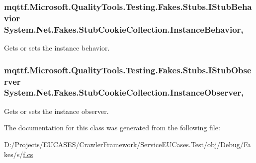\hypertarget{class_system_1_1_net_1_1_fakes_1_1_stub_cookie_collection_ac4af0aa7fdcf96266613478fdea97b8f}{
\subsubsection[{Instance\-Behavior}]{\setlength{\rightskip}{0pt plus 5cm}mqttf.\-Microsoft.\-Quality\-Tools.\-Testing.\-Fakes.\-Stubs.\-I\-Stub\-Behavior System.\-Net.\-Fakes.\-Stub\-Cookie\-Collection.\-Instance\-Behavior\hspace{0.3cm}{\ttfamily [get]}, {\ttfamily [set]}}}\label{class_system_1_1_net_1_1_fakes_1_1_stub_cookie_collection_ac4af0aa7fdcf96266613478fdea97b8f}


Gets or sets the instance behavior.

\hypertarget{class_system_1_1_net_1_1_fakes_1_1_stub_cookie_collection_af2cf97306a87b8083b285aaac441acd6}{
\subsubsection[{Instance\-Observer}]{\setlength{\rightskip}{0pt plus 5cm}mqttf.\-Microsoft.\-Quality\-Tools.\-Testing.\-Fakes.\-Stubs.\-I\-Stub\-Observer System.\-Net.\-Fakes.\-Stub\-Cookie\-Collection.\-Instance\-Observer\hspace{0.3cm}{\ttfamily [get]}, {\ttfamily [set]}}}\label{class_system_1_1_net_1_1_fakes_1_1_stub_cookie_collection_af2cf97306a87b8083b285aaac441acd6}


Gets or sets the instance observer.



The documentation for this class was generated from the following file\-:\begin{DoxyCompactItemize}
\item 
D\-:/\-Projects/\-E\-U\-C\-A\-S\-E\-S/\-Crawler\-Framework/\-Service\-E\-U\-Cases.\-Test/obj/\-Debug/\-Fakes/s/\hyperlink{s_2f_8cs}{f.\-cs}\end{DoxyCompactItemize}
